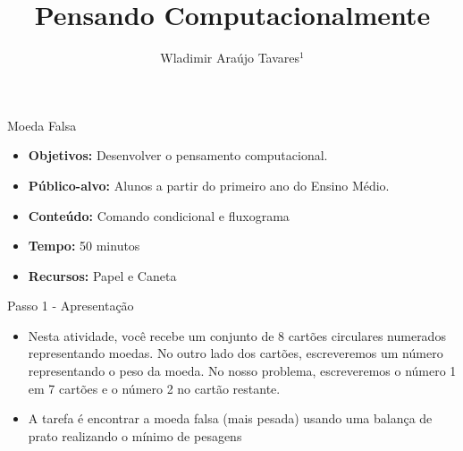 \documentclass{beamer}
\title {Pensando Computacionalmente}
\author[Wladimir Araújo Tavares]{ Wladimir Araújo Tavares$^{1}$  }
\institute[UFC]{$^{1}$Universidade Federal do Ceará - Campus de Quixadá\\}
\date{}
\begin{document}
\begin{frame}
	\titlepage
\end{frame}




\begin{frame}{Moeda Falsa}

\begin{itemize}
\item \textbf{Objetivos:} Desenvolver o pensamento computacional.

\item \textbf{Público-alvo:}  Alunos a partir do primeiro ano do Ensino Médio.

\item \textbf{Conteúdo:} Comando condicional e fluxograma

\item \textbf{Tempo:} 50 minutos

\item \textbf{Recursos:} Papel e Caneta

\end{itemize}
    
\end{frame}




\begin{frame}{Passo 1 - Apresentação}

\begin{itemize}
   
\item <1->Nesta atividade, você recebe um conjunto de 8 cartões circulares numerados representando moedas. No outro lado dos cartões, escreveremos um número representando o peso da moeda. No nosso problema, escreveremos o número 1 em 7 cartões e o número 2 no cartão restante.




\begin{center}
\end{center}


\item <2->A tarefa é encontrar a moeda falsa (mais pesada) usando uma balança de prato realizando o mínimo de pesagens



\end{itemize}

\end{frame}
\end{document}
